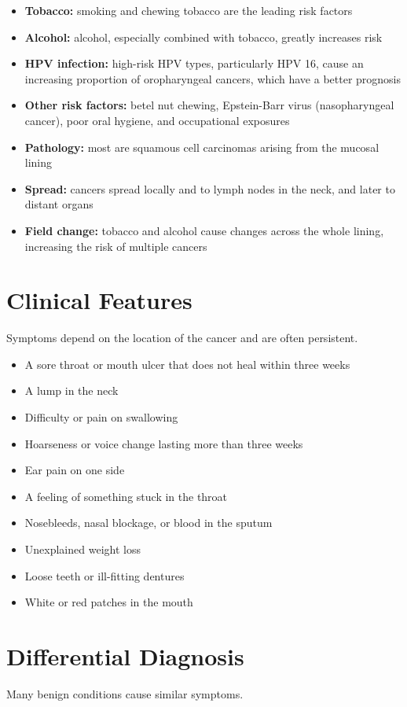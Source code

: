 \begin{itemize}
    \item \textbf{Tobacco:} smoking and chewing tobacco are the leading risk factors
    \item \textbf{Alcohol:} alcohol, especially combined with tobacco, greatly increases risk
    \item \textbf{HPV infection:} high-risk HPV types, particularly HPV 16, cause an increasing proportion of oropharyngeal cancers, which have a better prognosis
    \item \textbf{Other risk factors:} betel nut chewing, Epstein-Barr virus (nasopharyngeal cancer), poor oral hygiene, and occupational exposures
    \item \textbf{Pathology:} most are squamous cell carcinomas arising from the mucosal lining
    \item \textbf{Spread:} cancers spread locally and to lymph nodes in the neck, and later to distant organs
    \item \textbf{Field change:} tobacco and alcohol cause changes across the whole lining, increasing the risk of multiple cancers
\end{itemize}

\section*{Clinical Features}
Symptoms depend on the location of the cancer and are often persistent.

\begin{itemize}
    \item A sore throat or mouth ulcer that does not heal within three weeks
    \item A lump in the neck
    \item Difficulty or pain on swallowing
    \item Hoarseness or voice change lasting more than three weeks
    \item Ear pain on one side
    \item A feeling of something stuck in the throat
    \item Nosebleeds, nasal blockage, or blood in the sputum
    \item Unexplained weight loss
    \item Loose teeth or ill-fitting dentures
    \item White or red patches in the mouth
\end{itemize}

\section*{Differential Diagnosis}
Many benign conditions cause similar symptoms.

